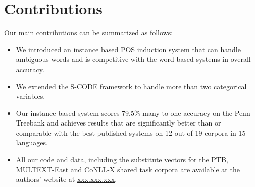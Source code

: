 \section{Contributions}
\label{sec:contrib}
Our main contributions can be summarized as follows:
\begin{itemize}
\item We introduced an instance based POS induction system that can
  handle ambiguous words and is competitive with the word-based systems in
  overall accuracy.  
\item We extended the S-CODE framework to handle more than two categorical
  variables. 
\item Our instance based system scores 79.5\% many-to-one accuracy on
  the Penn Treebank and achieves results that are significantly better
  than or comparable with the best published systems on 12 out of 19
  corpora in 15 languages.
\item All our code and data, including the substitute vectors for the
  PTB, MULTEXT-East and CoNLL-X shared task corpora are available
  at the authors' website at \mbox{\url{xxx.xxx.xxx}}.
\end{itemize}

